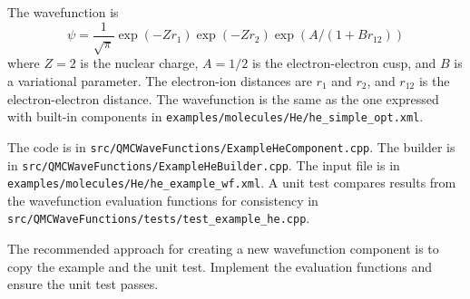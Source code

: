 The wavefunction is
\begin{equation}
\psi = \frac{1}{\sqrt{\pi}} \exp(-Z r_1) \exp(-Z r_2) \exp(A / (1 + B r_{12}))
\end{equation}
where $Z = 2$ is the nuclear charge, $A=1/2$ is the electron-electron cusp, and $B$ is a variational parameter.
The electron-ion distances are $r_1$ and $r_2$, and $r_{12}$ is the electron-electron distance.
The wavefunction is the same as the one expressed with built-in components in \texttt{examples/molecules/He/he\_simple\_opt.xml}.

The code is in \texttt{src/QMCWaveFunctions/ExampleHeComponent.cpp}.
The builder is in \texttt{src/QMCWaveFunctions/ExampleHeBuilder.cpp}.
The input file is in \texttt{examples/molecules/He/he\_example\_wf.xml}.
A unit test compares results from the wavefunction evaluation functions for
consistency in \texttt{src/QMCWaveFunctions/tests/test\_example\_he.cpp}.

The recommended approach for creating a new wavefunction component is to copy the example and the unit test.
Implement the evaluation functions and ensure the unit test passes.
